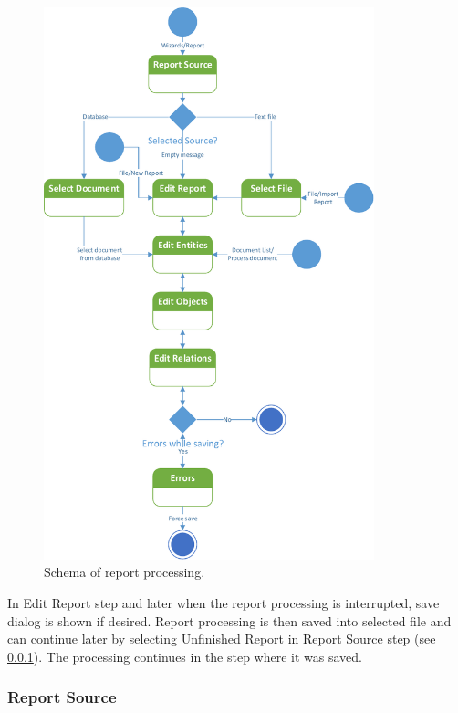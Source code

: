 \begin{figure}[!htb]
        \centering
        \includegraphics[height=16cm,keepaspectratio]{Images/pipeline}
        \caption{Schema of report processing.}
        \label{fig:Pipeline}
\end{figure}

In Edit Report step and later when the report processing is interrupted, save
dialog is shown if desired. Report processing is then saved into selected file
and can continue later by selecting Unfinished Report in Report Source step (see
\ref{sssec:ReportSource}). The processing continues in the step where it was
saved.


\subsubsection{Report Source}
\label{sssec:ReportSource}

